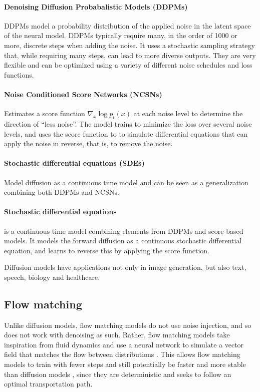 \documentclass{article}
\begin{document}
\paragraph{Denoising Diffusion Probabalistic Models (DDPMs)} 
DDPMs model a probability distribution of the applied noise in the latent space of the neural model. DDPMs typically require many, in the order of 1000 or more, discrete steps when adding the noise. It uses a stochastic sampling strategy that, while requiring many steps, can lead to more diverse outputs. They are very flexible and can be optimized using a variety of different noise schedules and loss functions.

\paragraph{Noise Conditioned Score Networks (NCSNs)} 
Estimates a score function $\nabla_x \log p_t(x)$ at each noise level to determine the direction of ``less noise''. The model trains to minimize the loss over several noise levels, and uses the score function to to simulate differential equations that can apply the noise in reverse, that is, to remove the noise.

\paragraph{Stochastic differential equations (SDEs)} 
Model diffusion as a continuous time model and can be seen as a generalization combining both DDPMs and NCSNs.


\paragraph{Stochastic differential equations} is a continuous time model combining elements from DDPMs and score-based models. It models the forward diffusion as a continuous stochastic differential equation, and learns to reverse this by applying the score function.

Diffusion models have applications not only in image generation, but also text, speech, biology and healthcare. \cite{cao2024survey}

\subsection{Flow matching}

Unlike diffusion models, flow matching models do not use noise injection, and so does not work with denoising as such. Rather, flow matching models take inspiration from fluid dynamics and use a neural network to simulate a vector field that matches the flow between distributions \cite{holderrieth2025introduction}. This allows flow matching models to train with fewer steps \cite{kornilov2024optimal} and still potentially be faster and more stable than diffusion models \cite{lipman2022flow}, since they are deterministic and seeks to follow an optimal transportation path. 
\end{document}
